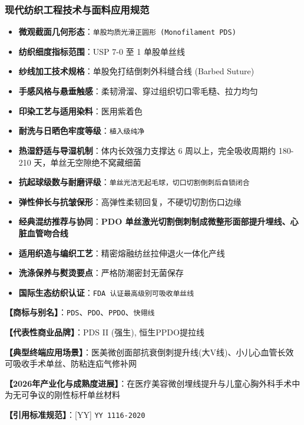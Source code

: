 \documentclass[11pt,openright,twoside,UTF8]{ctexbook}
\begin{document}
\subsubsection*{现代纺织工程技术与面料应用规范}
\begin{itemize} \setlength{\itemsep}{2pt}
    \item \textbf{微观截面几何形态}：\texttt{单股均质光滑正圆形 (Monofilament PDS)}
    \item \textbf{纺织细度指标范围}：USP 7-0 至 1 单股单丝线
    \item \textbf{纱线加工技术规格}：单股免打结倒刺外科缝合线 (Barbed Suture)
    \item \textbf{手感风格与悬垂触感}：柔韧滑溜、穿过组织切口零毛糙、拉力均匀
    \item \textbf{印染工艺与适用染料}：医用紫着色
    \item \textbf{耐洗与日晒色牢度等级}：\texttt{植入级纯净}
    \item \textbf{热湿舒适与导湿机制}：体内长效强力支撑达 6 周以上，完全吸收周期约 180-210 天，单丝无空隙绝不窝藏细菌
    \item \textbf{抗起球级数与耐磨评级}：\texttt{单丝光洁无起毛球，切口切割倒刺后自锁闭合}
    \item \textbf{弹性伸长与抗皱保形}：高弹性柔韧回复，不硬切切割伤口边缘
    \item \textbf{经典混纺推荐与协同}：\textbf{PDO 单丝激光切割倒刺制成微整形面部提升埋线、心脏血管吻合线}
    \item \textbf{适用织造与编织工艺}：精密熔融纺丝拉伸退火一体化产线
    \item \textbf{洗涤保养与熨烫要点}：严格防潮密封无菌保存
    \item \textbf{国际生态纺织认证}：\texttt{FDA 认证最高级别可吸收单丝线}
\end{itemize}
\vspace{0.2cm}

\noindent\textbf{【商标与别名】}：\texttt{PDS}、\texttt{PDO}、\texttt{PPDO}、\texttt{快翎线}\par
\noindent\textbf{【代表性商业品牌】}：PDS II (强生), 恒生PPDO提拉线\par
\noindent\textbf{【典型终端应用场景】}：医美微创面部抗衰倒刺提升线(大V线)、小儿心血管长效可吸收手术单丝、防粘连疝气修补网\par
\noindent\textbf{【2026年产业化与成熟度进展】}：在医疗美容微创埋线提升与儿童心胸外科手术中为无可争议的刚性标杆单丝材料\par
\noindent\textbf{【引用标准规范】}：[YY] \texttt{YY 1116-2020}\par
\vspace{0.5cm}
\end{document}
